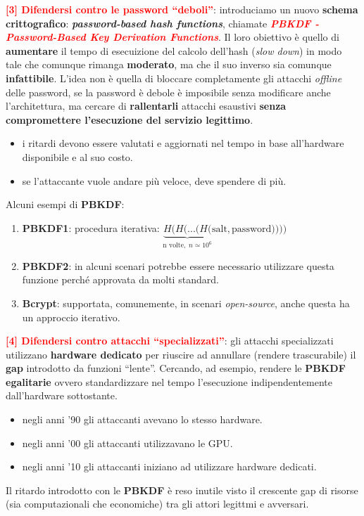 \begin{flushleft}
    \textcolor{red}{\textbf{[3] Difendersi contro le password ``deboli''}}: introduciamo un nuovo \textbf{schema crittografico}: \textbf{\textit{password-based hash functions}}, chiamate \textcolor{red}{\textbf{\textit{PBKDF - Password-Based Key Derivation Functions}}}. Il loro obiettivo è quello di \textbf{aumentare} il tempo di esecuizione del calcolo dell'hash (\textit{slow down}) in modo tale che comunque rimanga \textbf{moderato}, ma che il suo inverso sia comunque \textbf{infattibile}. L'idea non è quella di bloccare completamente gli attacchi \textit{offline} delle password, se la password è debole è imposibile senza modificare anche l'architettura, ma cercare di \textbf{rallentarli} attacchi esaustivi \textbf{senza compromettere l'esecuzione del servizio legittimo}.
    \begin{itemize}[nosep]
        \item i ritardi devono essere valutati e aggiornati nel tempo in base all'hardware disponibile e al suo costo.
        \item se l'attaccante vuole andare più veloce, deve spendere di più.
    \end{itemize}

    Alcuni esempi di \textbf{PBKDF}:
    \begin{enumerate}[nosep]
        \item \textbf{PBKDF1}: procedura iterativa: $\underset{\text{n volte}, \; n \simeq 10^6}{\underbrace{H(H(...(H(}}\text{salt}, \text{password}))))$
        \item \textbf{PBKDF2}: in alcuni scenari potrebbe essere necessario utilizzare questa funzione perché approvata da molti standard.
        \item \textbf{Bcrypt}: supportata, comunemente, in scenari \textit{open-source}, anche questa ha un approccio iterativo.
    \end{enumerate}

    \smallskip

    \textcolor{red}{\textbf{[4] Difendersi contro attacchi ``specializzati''}}: gli attacchi specializzati utilizzano \textbf{hardware dedicato} per riuscire ad annullare (rendere trascurabile) il \textbf{gap} introdotto da funzioni ``lente''. Cercando, ad esempio, rendere le \textbf{PBKDF egalitarie} ovvero standardizzare nel tempo l'esecuzione indipendentemente dall'hardware sottostante.
    \begin{itemize}[nosep]
        \item negli anni '90 gli attaccanti avevano lo stesso hardware.
        \item negli anni '00 gli attaccanti utilizzavano le GPU.
        \item negli anni '10 gli attaccanti iniziano ad utilizzare hardware dedicati.
    \end{itemize}
    Il ritardo introdotto con le \textbf{PBKDF} è reso inutile visto il crescente gap di risorse (sia computazionali che economiche) tra gli attori legittmi e avversari.


\end{flushleft}
